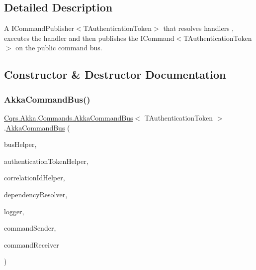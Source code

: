 \subsection{Detailed Description}
A I\+Command\+Publisher$<$\+T\+Authentication\+Token$>$ that resolves handlers , executes the handler and then publishes the I\+Command$<$\+T\+Authentication\+Token$>$ on the public command bus. 



\subsection{Constructor \& Destructor Documentation}
\mbox{\label{classCqrs_1_1Akka_1_1Commands_1_1AkkaCommandBus_a765b65e299cc1b32c4c0e7ee405c473d}} 
\subsubsection{\texorpdfstring{Akka\+Command\+Bus()}{AkkaCommandBus()}}
{\footnotesize\ttfamily \hyperlink{classCqrs_1_1Akka_1_1Commands_1_1AkkaCommandBus}{Cqrs.\+Akka.\+Commands.\+Akka\+Command\+Bus}$<$ T\+Authentication\+Token $>$.\hyperlink{classCqrs_1_1Akka_1_1Commands_1_1AkkaCommandBus}{Akka\+Command\+Bus} (\begin{DoxyParamCaption}\item[{\hyperlink{interfaceCqrs_1_1Bus_1_1IBusHelper}{I\+Bus\+Helper}}]{bus\+Helper,  }\item[{\hyperlink{interfaceCqrs_1_1Authentication_1_1IAuthenticationTokenHelper}{I\+Authentication\+Token\+Helper}$<$ T\+Authentication\+Token $>$}]{authentication\+Token\+Helper,  }\item[{I\+Correlation\+Id\+Helper}]{correlation\+Id\+Helper,  }\item[{\hyperlink{interfaceCqrs_1_1Configuration_1_1IDependencyResolver}{I\+Dependency\+Resolver}}]{dependency\+Resolver,  }\item[{I\+Logger}]{logger,  }\item[{\hyperlink{interfaceCqrs_1_1Commands_1_1ICommandPublisher}{I\+Command\+Publisher}$<$ T\+Authentication\+Token $>$}]{command\+Sender,  }\item[{\hyperlink{interfaceCqrs_1_1Commands_1_1ICommandReceiver}{I\+Command\+Receiver}$<$ T\+Authentication\+Token $>$}]{command\+Receiver }\end{DoxyParamCaption})}



